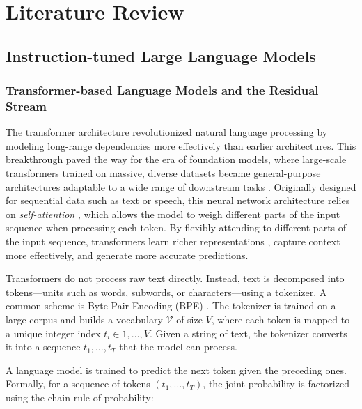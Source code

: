 \chapter{Literature Review}\label{ch:literature_review}

\section{Instruction-tuned Large Language Models}

\subsection{Transformer-based Language Models and the Residual Stream}

The transformer architecture \cite{vaswaniAttentionAllYou2023} revolutionized natural language processing by modeling long-range dependencies more effectively than earlier architectures. This breakthrough paved the way for the era of foundation models, where large-scale transformers trained on massive, diverse datasets became general-purpose architectures adaptable to a wide range of downstream tasks \cite{bommasaniOpportunitiesRisksFoundation2022}. Originally designed for sequential data such as text or speech, this neural network architecture relies on \textit{self-attention} \cite{bahdanauNeuralMachineTranslation2016, parikhDecomposableAttentionModel2016}, which allows the model to weigh different parts of the input sequence when processing each token. By flexibly attending to different parts of the input sequence, transformers learn richer representations \cite{bengioRepresentationLearningReview2014}, capture context more effectively, and generate more accurate predictions.

Transformers do not process raw text directly. Instead, text is decomposed into tokens---units such as words, subwords, or characters---using a tokenizer. A common scheme is Byte Pair Encoding (BPE) \cite{sennrichNeuralMachineTranslation2016}. The tokenizer is trained on a large corpus and builds a vocabulary $\mathcal{V}$ of size $V$, where each token is mapped to a unique integer index $t_i \in {1, \ldots, V}$. Given a string of text, the tokenizer converts it into a sequence ${t_1, \ldots, t_T}$ that the model can process.

A language model is trained to predict the next token given the preceding ones. Formally, for a sequence of tokens $(t_1, \ldots, t_T)$, the joint probability is factorized using the chain rule of probability:

